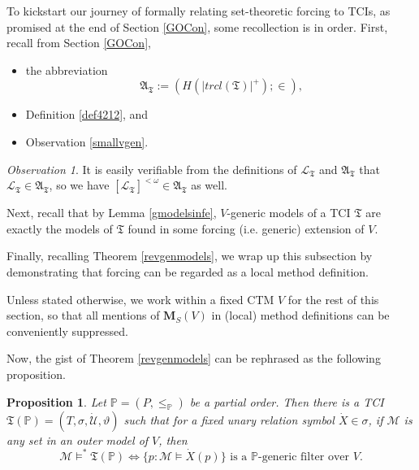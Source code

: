 \documentclass[12pt, twoside]{memoir}
\numberwithin{equation}{section}
\newtheorem{prop}[thm]{Proposition}
\theoremstyle{definition}
\theoremstyle{remark}
\newtheorem{ob}[thm]{Observation}
\theoremstyle{definition}
\theoremstyle{definition}
\theoremstyle{definition}
\theoremstyle{remark}
\begin{document}
To kickstart our journey of formally relating set-theoretic forcing to TCIs, as promised at the end of Section \ref{GOCon}, some recollection is in order. First, recall from Section \ref{GOCon}, 
\begin{itemize}
    \item the abbreviation
    \begin{equation*}
        \mathfrak{A}_{\mathfrak{T}} := (H(|trcl(\mathfrak{T})|^+); \in) \text{,}
    \end{equation*}
    \item Definition \ref{def4212}, and 
    \item Observation \ref{smallvgen}.
\end{itemize}

\begin{ob}\label{ob331}
It is easily verifiable from the definitions of $\mathcal{L}_{\mathfrak{T}}$ and $\mathfrak{A}_{\mathfrak{T}}$ that $\mathcal{L}_{\mathfrak{T}} \in \mathfrak{A}_{\mathfrak{T}}$, so we have $[\mathcal{L}_{\mathfrak{T}}]^{< \omega} \in \mathfrak{A}_{\mathfrak{T}}$ as well.
\end{ob}

Next, recall that by Lemma \ref{gmodelsinfe}, $V$-generic models of a TCI $\mathfrak{T}$ are exactly the models of $\mathfrak{T}$ found in some forcing (i.e. generic) extension of $V$.

Finally, recalling Theorem \ref{revgenmodels}, we wrap up this subsection by demonstrating that forcing can be regarded as a local method definition.

Unless stated otherwise, we work within a fixed CTM $V$ for the rest of this section, so that all mentions of $\mathbf{M}_S(V)$ in (local) method definitions can be conveniently suppressed.

Now, the gist of Theorem \ref{revgenmodels} can be rephrased as the following proposition.

\begin{prop}\label{prop323}
Let $\mathbb{P} = (P, \leq_{\mathbb{P}})$ be a partial order. Then there is a TCI $\mathfrak{T}(\mathbb{P}) = (T, \sigma, \dot{\mathcal{U}}, \vartheta)$ such that for a fixed unary relation symbol $\dot{X} \in \sigma$, if $\mathcal{M}$ is any set in an outer model of $V$, then
\begin{equation*}
    \mathcal{M} \models^* \mathfrak{T}(\mathbb{P}) \iff \{p : \mathcal{M} \models \dot{X}(p)\} \text{ is a } \mathbb{P} \text{-generic filter over } V \text{.}
\end{equation*}
\end{prop}
\end{document}
